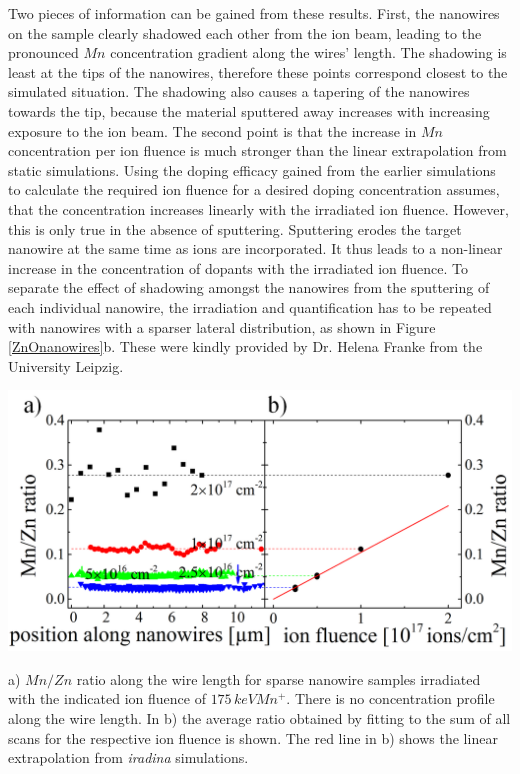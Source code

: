 Two pieces of information can be gained from these results. First, the nanowires on the sample clearly shadowed each other from the ion beam, leading to the pronounced $Mn$ concentration gradient along the wires' length. The shadowing is least at the tips of the nanowires, therefore these points correspond closest to the simulated situation. The shadowing also causes a tapering of the nanowires towards the tip, because the material sputtered away increases with increasing exposure to the ion beam. The second point is that the increase in $Mn$ concentration per ion fluence is much stronger than the linear extrapolation from static simulations. Using the doping efficacy gained from the earlier simulations to calculate the required ion fluence for a desired doping concentration assumes, that the concentration increases linearly with the irradiated ion fluence. However, this is only true in the absence of sputtering. Sputtering erodes the target nanowire at the same time as ions are incorporated. It thus leads to a non-linear increase in the concentration of dopants with the irradiated ion fluence. To separate the effect of shadowing amongst the nanowires from the sputtering of each individual nanowire, the irradiation and quantification has to be repeated with nanowires with a sparser lateral distribution, as shown in Figure \ref{ZnOnanowires}b. These were kindly provided by Dr. Helena Franke from the University Leipzig.


\begin{Figure}[th]
	\centering
		\includegraphics[width=.85\textwidth]{images/MnZn2.png}
	\caption{a) $Mn/Zn$ ratio along the wire length for sparse nanowire samples irradiated with the indicated ion fluence of $175\,keV Mn^+$. There is no concentration profile along the wire length. In b) the average ratio obtained by fitting to the sum of all scans for the respective ion fluence is shown. The red line in b) shows the linear extrapolation from \emph{iradina} simulations.}
	\label{MnZn2}
\end{Figure} 

